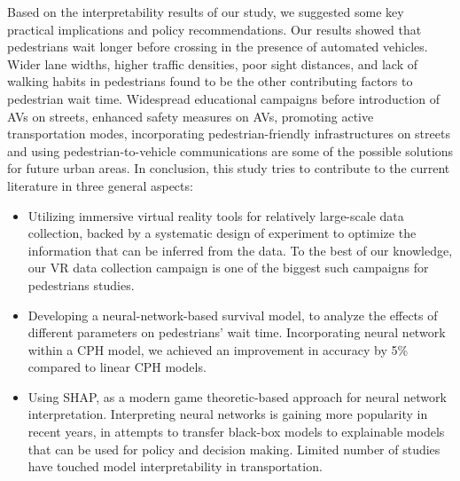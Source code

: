 Based on the interpretability results of our study, we suggested some key practical implications and policy recommendations. Our results showed that pedestrians wait longer before crossing in the presence of automated vehicles. Wider lane widths, higher traffic densities, poor sight distances, and lack of walking habits in pedestrians found to be the other contributing factors to pedestrian wait time. Widespread educational campaigns before introduction of AVs on streets, enhanced safety measures on AVs, promoting active transportation modes, incorporating pedestrian-friendly infrastructures on streets and using pedestrian-to-vehicle communications are some of the possible solutions for future urban areas.
In conclusion, this study tries to contribute to the current literature in three general aspects:
\begin{itemize}
    \item Utilizing immersive virtual reality tools for relatively large-scale data collection, backed by a systematic design of experiment to optimize the information that can be inferred from the data. To the best of our knowledge, our VR data collection campaign is one of the biggest such campaigns for pedestrians studies. 
    \item Developing a neural-network-based survival model, to analyze the effects of different parameters on pedestrians' wait time. Incorporating neural network within a CPH model, we achieved an improvement in accuracy by 5\% compared to linear CPH models. 
    \item Using SHAP, as a modern game theoretic-based approach for neural network interpretation. Interpreting neural networks is gaining more popularity in recent years, in attempts to transfer black-box models to explainable models that can be used for policy and decision making. Limited number of studies have touched model interpretability in transportation.  
\end{itemize}


